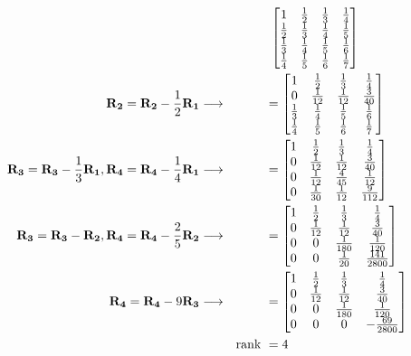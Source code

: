 \documentclass{article}
\begin{document}
\begin{align}
    \label{eq:1}
    && &\text{ } \begin{bmatrix}
    1&\frac{1}{2}&\frac{1}{3}&\frac{1}{4}\\
    \frac{1}{2}&\frac{1}{3}&\frac{1}{4}&\frac{1}{5}\\
    \frac{1}{3}&\frac{1}{4}&\frac{1}{5}&\frac{1}{6}\\
    \frac{1}{4}&\frac{1}{5}&\frac{1}{6}&\frac{1}{7}
    \end{bmatrix}
    \\
    \label{eq:2}
    \textbf{R\textsubscript{2}} = \textbf{R\textsubscript{2}} - \frac{1}{2}\textbf{R\textsubscript{1}}\longrightarrow && &= \begin{bmatrix}
    1&\frac{1}{2}&\frac{1}{3}&\frac{1}{4}\\
    0&\frac{1}{12}&\frac{1}{12}&\frac{3}{40}\\
    \frac{1}{3}&\frac{1}{4}&\frac{1}{5}&\frac{1}{6}\\
    \frac{1}{4}&\frac{1}{5}&\frac{1}{6}&\frac{1}{7}
    \end{bmatrix}
    \\
    \label{eq:3}
    \textbf{R\textsubscript{3}} = \textbf{R\textsubscript{3}} - \frac{1}{3}\textbf{R\textsubscript{1}}, \textbf{R\textsubscript{4}} = \textbf{R\textsubscript{4}} - \frac{1}{4}\textbf{R\textsubscript{1}} \longrightarrow && &= \begin{bmatrix}
    1&\frac{1}{2}&\frac{1}{3}&\frac{1}{4}\\
    0&\frac{1}{12}&\frac{1}{12}&\frac{3}{40}\\
    0&\frac{1}{12}&\frac{4}{45}&\frac{1}{12}\\
    0&\frac{1}{30}&\frac{1}{12}&\frac{9}{112}
    \end{bmatrix}
    \\
    \label{eq:4}
    \textbf{R\textsubscript{3}} = \textbf{R\textsubscript{3}} - \textbf{R\textsubscript{2}}, \textbf{R\textsubscript{4}} = \textbf{R\textsubscript{4}} - \frac{2}{5}\textbf{R\textsubscript{2}} \longrightarrow && &= \begin{bmatrix}
    1&\frac{1}{2}&\frac{1}{3}&\frac{1}{4}\\
    0&\frac{1}{12}&\frac{1}{12}&\frac{3}{40}\\
    0&0&\frac{1}{180}&\frac{1}{120}\\
    0&0&\frac{1}{20}&\frac{141}{2800}
    \end{bmatrix}
    \\
    \label{eq:5}
    \textbf{R\textsubscript{4}} = \textbf{R\textsubscript{4}} - 9\textbf{R\textsubscript{3}} \longrightarrow && &= \begin{bmatrix}
    1&\frac{1}{2}&\frac{1}{3}&\frac{1}{4}\\
    0&\frac{1}{12}&\frac{1}{12}&\frac{3}{40}\\
    0&0&\frac{1}{180}&\frac{1}{120}\\
    0&0&0&-\frac{69}{2800}
    \end{bmatrix}
    \\
    \label{eq:6}
    &&
    \text{rank } &= 4
\end{align}
\end{document}
